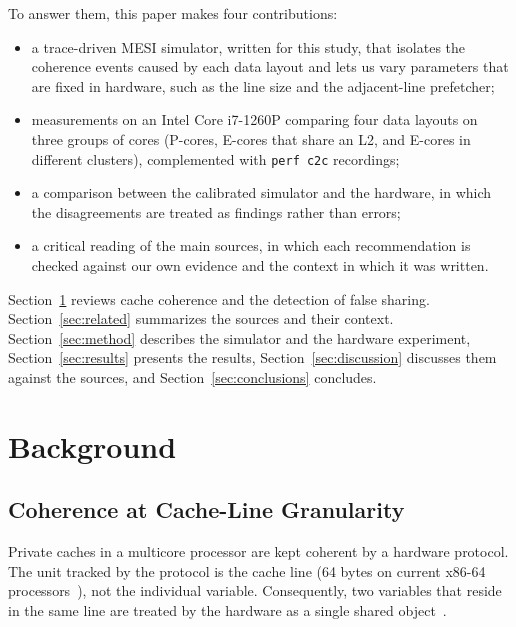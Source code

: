 \documentclass[journal]{IEEEtran}
\begin{document}
To answer them, this paper makes four contributions:
\begin{itemize}
  \item a trace-driven MESI simulator, written for this study, that isolates
        the coherence events caused by each data layout and lets us vary
        parameters that are fixed in hardware, such as the line size and the
        adjacent-line prefetcher;
  \item measurements on an Intel Core i7-1260P comparing four data layouts on
        three groups of cores (P-cores, E-cores that share an L2, and E-cores in
        different clusters), complemented with \texttt{perf c2c} recordings;
  \item a comparison between the calibrated simulator and the hardware, in
        which the disagreements are treated as findings rather than errors;
  \item a critical reading of the main sources, in which each recommendation
        is checked against our own evidence and the context in which it was
        written.
\end{itemize}

Section~\ref{sec:background} reviews cache coherence and the detection of false
sharing. Section~\ref{sec:related} summarizes the sources and their context.
Section~\ref{sec:method} describes the simulator and the hardware experiment,
Section~\ref{sec:results} presents the results, Section~\ref{sec:discussion}
discusses them against the sources, and Section~\ref{sec:conclusions}
concludes.

\section{Background}
\label{sec:background}

\subsection{Coherence at Cache-Line Granularity}
Private caches in a multicore processor are kept coherent by a hardware
protocol. The unit tracked by the protocol is the cache line (64 bytes on
current x86-64 processors~\cite{intel2024opt}), not the individual variable.
Consequently, two variables that reside in the same line are treated by the
hardware as a single shared object~\cite{hennessy2017ca,nagarajan2020primer}.
\end{document}
